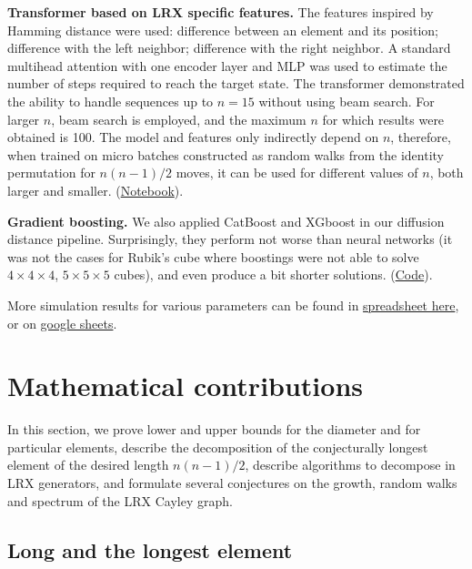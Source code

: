 \documentclass[reqno,11pt]{amsart}
\begin{document}
{\bf Transformer based on LRX specific features.}
The features inspired by Hamming distance were used:  difference between an element and its position;  difference with the left neighbor;  difference with the right neighbor.  A standard multihead attention with one encoder layer and MLP was used to estimate the number of steps required to reach the target state. The transformer demonstrated the ability to handle sequences up to $n=15$ without using beam search. For larger $n$, beam search is employed, and the maximum $n$ for which results were obtained is 100. The model and features only indirectly depend on $n$, therefore, when trained on micro batches constructed as random walks from the identity permutation for $n(n-1)/2$ moves, it can be used for different values of $n$, both larger and smaller.  (\href{https://www.kaggle.com/code/sergeifironov/permutation-transformer-solver-100}{Notebook}). 

{\bf Gradient boosting.} We also applied CatBoost and XGboost in our diffusion distance pipeline. Surprisingly, they perform not worse than neural networks (it was not the cases for Rubik's cube where boostings were not able to solve $4\times 4 \times 4$, $5\times5 \times5$ cubes), and even produce a bit shorter solutions. 
(\href{https://www.kaggle.com/code/antoninadolgorukova/lrx-gbm-powered-pathfinding}{Code}).

More simulation results for various parameters can be found in \href{https://www.kaggle.com/competitions/lrx-oeis-a-186783-brainstorm-math-conjecture/discussion/612338}{spreadsheet here}, or  on \href{https://docs.google.com/spreadsheets/d/1KFYTqPDSdH8_vdvWz3YLTLKg5IlW1Kkx_9kJClSKGOs/edit?usp=sharing}{google sheets}.

\section{Mathematical contributions}

In this section, we prove lower and upper bounds for the diameter and for particular elements, describe the decomposition of the conjecturally longest element of the desired length $n(n-1)/2$, describe algorithms to decompose in LRX generators, and formulate several conjectures on the growth, random walks and spectrum of the LRX Cayley graph. 

\subsection{Long and the longest element}
\end{document}
